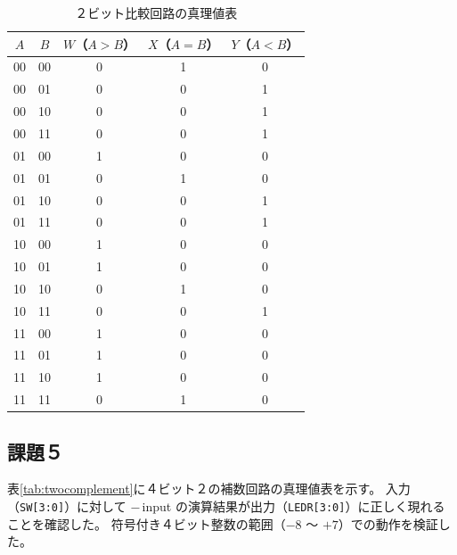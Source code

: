 \documentclass[12pt,a4paper]{ltjsarticle}
\begin{document}
\begin{table}[H]
  \centering
  \caption{２ビット比較回路の真理値表}
  \label{tab:compare2bits}
  \begin{tabular}{cc|ccc}
    \toprule
    $A$ & $B$ & $W$（$A>B$） & $X$（$A=B$） & $Y$（$A<B$） \\
    \midrule
    00 & 00 & 0 & 1 & 0 \\
    00 & 01 & 0 & 0 & 1 \\
    00 & 10 & 0 & 0 & 1 \\
    00 & 11 & 0 & 0 & 1 \\
    01 & 00 & 1 & 0 & 0 \\
    01 & 01 & 0 & 1 & 0 \\
    01 & 10 & 0 & 0 & 1 \\
    01 & 11 & 0 & 0 & 1 \\
    10 & 00 & 1 & 0 & 0 \\
    10 & 01 & 1 & 0 & 0 \\
    10 & 10 & 0 & 1 & 0 \\
    10 & 11 & 0 & 0 & 1 \\
    11 & 00 & 1 & 0 & 0 \\
    11 & 01 & 1 & 0 & 0 \\
    11 & 10 & 1 & 0 & 0 \\
    11 & 11 & 0 & 1 & 0 \\
    \bottomrule
  \end{tabular}
\end{table}

\subsection{課題５}

表\ref{tab:twocomplement}に４ビット２の補数回路の真理値表を示す。
入力（\texttt{SW[3:0]}）に対して $-$\,input の演算結果が出力（\texttt{LEDR[3:0]}）に正しく現れることを確認した。
符号付き４ビット整数の範囲（$-8$ ～ $+7$）での動作を検証した。
\end{document}

